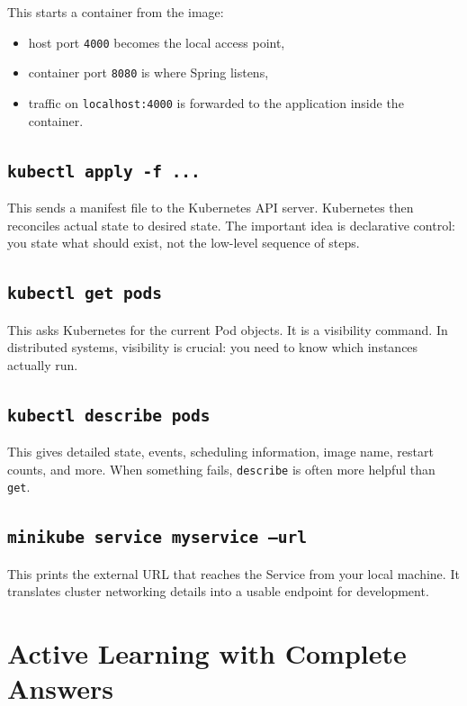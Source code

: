 \documentclass[a4paper,11pt]{article}
\begin{document}
This starts a container from the image:

\begin{itemize}
  \item host port \texttt{4000} becomes the local access point,
  \item container port \texttt{8080} is where Spring listens,
  \item traffic on \texttt{localhost:4000} is forwarded to the application inside the container.
\end{itemize}

\subsection{\texttt{kubectl apply -f ...}}

This sends a manifest file to the Kubernetes API server. Kubernetes then reconciles actual state to desired state. The important idea is declarative control: you state what should exist, not the low-level sequence of steps.

\subsection{\texttt{kubectl get pods}}

This asks Kubernetes for the current Pod objects. It is a visibility command. In distributed systems, visibility is crucial: you need to know which instances actually run.

\subsection{\texttt{kubectl describe pods}}

This gives detailed state, events, scheduling information, image name, restart counts, and more. When something fails, \texttt{describe} is often more helpful than \texttt{get}.

\subsection{\texttt{minikube service myservice --url}}

This prints the external URL that reaches the Service from your local machine. It translates cluster networking details into a usable endpoint for development.

\section{Active Learning with Complete Answers}
\end{document}
